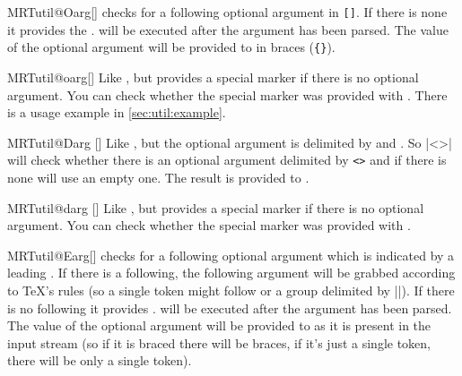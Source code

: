 \begin{describemacro}{MRTutil@Oarg}[]
  checks for a following optional argument in \texttt{[]}. If there is none it
  provides the .  will be executed after the
  argument has been parsed. The value of the optional argument will be provided
  to  in braces (\texttt{\{\}}).
\end{describemacro}

\begin{describemacro}{MRTutil@oarg}[]
  Like , but provides a special marker if there is no optional
  argument. You can check whether the special marker was provided with
  . There is a usage example in \autoref{sec:util:example}.
\end{describemacro}

\begin{describemacro}{MRTutil@Darg}%
  []
  Like , but the optional argument is delimited by
   and . So \bverb|\MRTutil@Darg<>{}\foo| will check
  whether there is an optional argument delimited by \texttt{<>} and if there is
  none will use an empty one. The result is provided to .
\end{describemacro}

\begin{describemacro}{MRTutil@darg}%
  []
  Like , but provides a special marker if there is no optional
  argument. You can check whether the special marker was provided with
  . 
\end{describemacro}

\begin{describemacro}{MRTutil@Earg}[]
  checks for a following optional argument which is indicated by a leading
  . If there is a  following, the following argument
  will be grabbed according to \TeX's rules (so a single token might follow or a
  group delimited by |{}|). If there is no  following it provides
  .  will be executed after the argument has been
  parsed. The value of the optional argument will be provided to 
  as it is present in the input stream (so if it is braced there will be braces,
  if it's just a single token, there will be only a single token).
\end{describemacro}

